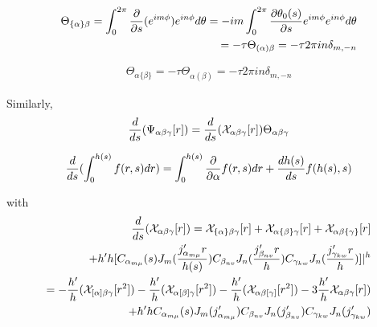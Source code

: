 \documentclass{Note}
\begin{document}
\begin{equation}
\begin{aligned}
\Theta_{\{\alpha\}\beta}=\int_0^{2\pi} {\partial \over \partial s}(e^{im\phi}) e^{in\phi} d\theta
=-im\int_0^{2\pi} {\partial\theta_0(s) \over \partial s}e^{im\phi}e^{in\phi} d\theta\\
=-\tau  \Theta_{(\alpha)\beta}=-\tau 2\pi   in \delta_{m,-n}
\end{aligned}
\end{equation}

\begin{equation}
\begin{aligned}
\Theta_{\alpha\{\beta\}}
=-\tau  \Theta_{\alpha(\beta)}=-\tau 2\pi   in \delta_{m,-n}
\end{aligned}
\end{equation}

Similarly,
\begin{equation}
\begin{aligned}
{d\over ds}(\Psi_{\alpha\beta\gamma}[r])={d\over ds}(\mathcal{X}_{\alpha\beta\gamma}[r])\Theta_{\alpha\beta\gamma}
\end{aligned}
\end{equation}


\begin{equation}
\begin{aligned}
{d\over ds}(\int_{0}^{h(s)}f(r,s)dr)=\int_0^{h(s)}{\partial \over \partial \alpha}f(r,s)dr+{dh(s)\over ds}f(h(s),s)
\end{aligned}
\end{equation}

with
\begin{equation}
\begin{aligned}
{d\over ds}(\mathcal{X}_{\alpha\beta\gamma}[r])
=\mathcal{X}_{\{\alpha\}\beta\gamma}[r]+\mathcal{X}_{\alpha\{\beta\}\gamma}[r]+\mathcal{X}_{\alpha\beta\{\gamma\}}[r]\\
+h'h[C_{\alpha_{m\mu}}(s) J_m({j'_{\alpha_{m\mu}}r\over h(s)})C_{\beta_{nv}} J_n({j'_{\beta_{nv}}r\over h})C_{\gamma_{kw}} J_n({j'_{\gamma_{kw}}r\over h})]|^h\\
=-{h'\over h}(\mathcal{X}_{[\alpha]\beta\gamma}[r^2])-{h'\over h}(\mathcal{X}_{\alpha[\beta]\gamma}[r^2])-{h'\over h}(\mathcal{X}_{\alpha\beta[\gamma]}[r^2])-3{h'\over h}\mathcal{X}_{\alpha\beta\gamma}[r])\\
+h'hC_{\alpha_{m\mu}}(s) J_m({j'_{\alpha_{m\mu}}})C_{\beta_{nv}} J_n({j'_{\beta_{nv}}})C_{\gamma_{kw}} J_n({j'_{\gamma_{kw}}})\\
\end{aligned}
\end{equation}
\end{document}

